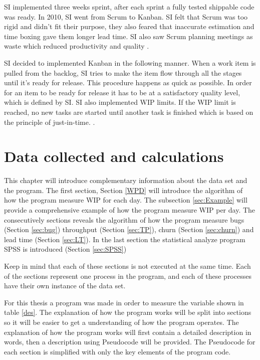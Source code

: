\documentclass[UKenglish]{ifimaster}  %
\begin{document}
SI implemented three weeks sprint, after each sprint a fully tested shippable code was ready. In 2010, SI went from Scrum to Kanban. SI felt that Scrum was too rigid and didn't fit their purpose, they also feared that inaccurate estimation and time boxing gave them longer lead time. SI also saw Scrum planning meetings as waste which reduced productivity and quality \parencite{Dag}. 

SI decided to implemented Kanban in the following manner. When a work item is pulled from the backlog, SI tries to make the item flow through all the stages until it's ready for release. This procedure happens as quick as possible. In order for an item to be ready for release it has to be at a satisfactory quality level, which is defined by SI. SI also implemented WIP limits. If the WIP limit is reached, no new tasks are started until another task is finished which is based on the principle of just-in-time. \parencite{Dag}.






\chapter{Data collected and calculations}
\label{ch:DCC}
This chapter will introduce complementary information about the data set and the program. The first section, Section \ref{WPD} will introduce the algorithm of how the program measure WIP for each day. The subsection \ref{sec:Example} will provide a comprehensive example of how the program measure WIP per day. The consecutively sections reveals the algorithm of how the program measure bugs (Section \ref{sec:bug}) throughput (Section \ref{sec:TP}),  churn (Section \ref{sec:churn}) and lead time (Section \ref{sec:LT}). In the last section the statistical analyze program SPSS is introduced (Section \ref{sec:SPSS})

Keep in mind that each of these sections is not executed at the same time. Each of the sections represent one process in the program, and each of these processes have their own instance of the data set.


For this thesis a program was made in order to measure the variable shown in table \ref{des}. The explanation of how the program works will be split into sections so it will be easier to get a understanding of how the program operates. The explanation of how the program works will first contain a detailed description in words, then a description using Pseudocode \parencite{jd} will be provided. The Pseudocode for each section is simplified with only the key elements of the program code. 
\end{document}
